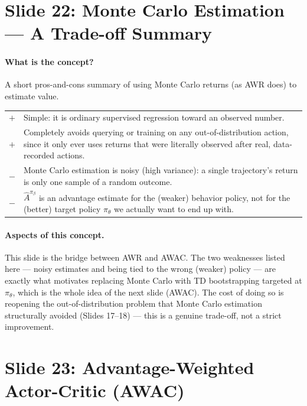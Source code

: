 \documentclass[11pt]{article}
\begin{document}
\section{Slide 22: Monte Carlo Estimation --- A Trade-off Summary}

\paragraph{What is the concept?}
A short pros-and-cons summary of using Monte Carlo returns (as AWR does) to estimate
value.

\begin{center}
\begin{tabular}{@{}p{1.2cm}p{12.3cm}@{}}
\toprule
& \\
\midrule
$+$ & Simple: it is ordinary supervised regression toward an observed number. \\
$+$ & Completely avoids querying or training on any out-of-distribution action, since it
only ever uses returns that were literally observed after real, data-recorded actions. \\
$-$ & Monte Carlo estimation is noisy (high variance): a single trajectory's return is
only one sample of a random outcome. \\
$-$ & $\hat A^{\pi_\beta}$ is an advantage estimate for the (weaker) behavior policy,
not for the (better) target policy $\pi_\theta$ we actually want to end up with. \\
\bottomrule
\end{tabular}
\end{center}

\paragraph{Aspects of this concept.}
This slide is the bridge between AWR and AWAC. The two weaknesses listed here --- noisy
estimates and being tied to the wrong (weaker) policy --- are exactly what motivates
replacing Monte Carlo with TD bootstrapping targeted at $\pi_\theta$, which is the whole
idea of the next slide (AWAC). The cost of doing so is reopening the out-of-distribution
problem that Monte Carlo estimation structurally avoided (Slides 17--18) --- this is a
genuine trade-off, not a strict improvement.

\section{Slide 23: Advantage-Weighted Actor-Critic (AWAC)}
\end{document}

